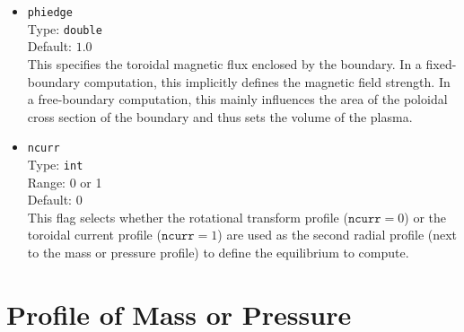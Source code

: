 \begin{itemize}

 \item \texttt{phiedge} \\
       Type: \texttt{double} \\
       Default: $1.0$ \\
       This specifies the toroidal magnetic flux enclosed by the boundary.
       In a fixed-boundary computation, this implicitly defines the magnetic field strength.
       In a free-boundary computation, this mainly influences the area of the poloidal cross section of the boundary
       and thus sets the volume of the plasma.

 \item \texttt{ncurr} \\
       Type: \texttt{int} \\
       Range: 0 or 1 \\
       Default: 0 \\
       This flag selects whether the rotational transform profile ($\texttt{ncurr} = 0$)
       or the toroidal current profile ($\texttt{ncurr} = 1$)
       are used as the second radial profile (next to the mass or pressure profile)
       to define the equilibrium to compute.

\end{itemize}

\section{Profile of Mass or Pressure}

